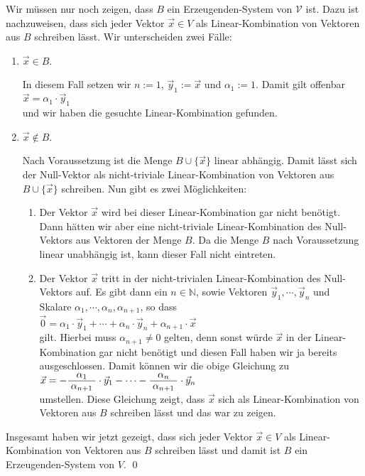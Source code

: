 \proof
Wir m\"{u}ssen nur noch zeigen, dass $B$ ein Erzeugenden-System von $\mathcal{V}$ ist.  Dazu ist nachzuweisen,
dass sich jeder Vektor $\vec{x} \in V$ als Linear-Kombination von Vektoren aus $B$ schreiben
l\"{a}sst.  Wir unterscheiden zwei F\"{a}lle:
\begin{enumerate}
\item $\vec{x} \in B$.

      In diesem Fall setzen wir $n := 1$, $\vec{y}_1 := \vec{x}$ und $\alpha_1 := 1$.  Damit
      gilt offenbar
      \\[0.2cm]
      \hspace*{1.3cm}
      $\vec{x} = \alpha_1 \cdot \vec{y}_1$
      \\[0.2cm]
      und wir haben die gesuchte Linear-Kombination gefunden.
\item $\vec{x} \not\in B$.

      Nach Voraussetzung ist die Menge $B \cup \{ \vec{x} \}$ linear abh\"{a}ngig.  Damit l\"{a}sst sich
      der Null-Vektor als nicht-triviale Linear-Kombination von Vektoren aus $B \cup \{\vec{x}\}$
      schreiben.  Nun gibt es zwei M\"{o}glichkeiten:
      \begin{enumerate}
      \item Der Vektor $\vec{x}$ wird bei dieser Linear-Kombination gar nicht ben\"{o}tigt.
            Dann h\"{a}tten wir aber eine nicht-triviale Linear-Kombination des Null-Vektors aus
            Vektoren der Menge $B$.  Da die Menge $B$ nach Voraussetzung linear unabh\"{a}ngig ist,
            kann dieser Fall nicht eintreten.
      \item Der Vektor $\vec{x}$ tritt in der nicht-trivialen Linear-Kombination des
            Null-Vektors auf.  Es gibt dann ein $n \in \mathbb{N}$, sowie Vektoren $\vec{y}_1,
            \cdots, \vec{y}_n$ und Skalare $\alpha_1, \cdots, \alpha_n, \alpha_{n+1}$,
            so dass 
            \\[0.2cm]
            \hspace*{1.3cm}
            $\vec{0} = \alpha_1 \cdot \vec{y}_1 + \cdots + \alpha_n \cdot \vec{y}_n + \alpha_{n+1} \cdot \vec{x}$
            \\[0.2cm]
            gilt.  Hierbei muss $\alpha_{n+1} \not=0$ gelten, denn sonst w\"{u}rde $\vec{x}$ in der
            Linear-Kombination gar nicht ben\"{o}tigt und diesen Fall haben wir ja bereits
            ausgeschlossen.  Damit 
            k\"{o}nnen wir die obige Gleichung zu
            \\[0.2cm]
            \hspace*{1.3cm}
            $\vec{x} = -\bruch{\alpha_1}{\alpha_{n+1}} \cdot \vec{y}_1 - \cdots - \bruch{\alpha_n}{\alpha_{n+1}} \cdot \vec{y}_n$
            \\[0.2cm] 
            umstellen.  Diese Gleichung zeigt, dass $\vec{x}$ sich als Linear-Kombination von Vektoren aus
            $B$ schreiben l\"{a}sst und das war zu zeigen. 
      \end{enumerate}
\end{enumerate}
Insgesamt haben wir jetzt gezeigt, dass sich jeder Vektor $\vec{x}\in V$ als Linear-Kombination
von Vektoren aus $B$ schreiben l\"{a}sst und damit ist $B$ ein Erzeugenden-System von $V$.  \qed

